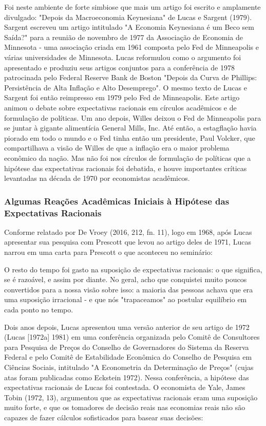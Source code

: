 \documentclass[12pt]{article}
\begin{document}
Foi neste ambiente de forte simbiose que mais um artigo foi escrito e amplamente divulgado: "Depois da Macroeconomia Keynesiana" de Lucas e Sargent (1979). Sargent escreveu um artigo intitulado "A Economia Keynesiana é um Beco sem Saída?" para a reunião de novembro de 1977 da Associação de Economia de Minnesota - uma associação criada em 1961 composta pelo Fed de Minneapolis e várias universidades de Minnesota. Lucas reformulou como o argumento foi apresentado e produziu seus artigos conjuntos para a conferência de 1978 patrocinada pelo Federal Reserve Bank de Boston "Depois da Curva de Phillips: Persistência de Alta Inflação e Alto Desemprego". O mesmo texto de Lucas e Sargent foi então reimpresso em 1979 pelo Fed de Minneapolis. Este artigo animou o debate sobre expectativas racionais em círculos acadêmicos e de formulação de políticas. Um ano depois, Willes deixou o Fed de Minneapolis para se juntar à gigante alimentícia General Mills, Inc. Até então, a estagflação havia piorado em todo o mundo e o Fed tinha então um presidente, Paul Volcker, que compartilhava a visão de Willes de que a inflação era o maior problema econômico da nação. Mas não foi nos círculos de formulação de políticas que a hipótese das expectativas racionais foi debatida, e houve importantes críticas levantadas na década de 1970 por economistas acadêmicos.

\subsubsection{\textbf{Algumas Reações Acadêmicas Iniciais à Hipótese das Expectativas Racionais}}

Conforme relatado por De Vroey (2016, 212, fn. 11), logo em 1968, após Lucas apresentar sua pesquisa com Prescott que levou ao artigo deles de 1971, Lucas narrou em uma carta para Prescott o que aconteceu no seminário:

O resto do tempo foi gasto na suposição de expectativas racionais: o que significa, se é razoável, e assim por diante. No geral, acho que conquistei muito poucos convertidos para a nossa visão sobre isso: a maioria das pessoas achava que era uma suposição irracional - e que nós "trapaceamos" ao postular equilíbrio em cada ponto no tempo.

Dois anos depois, Lucas apresentou uma versão anterior de seu artigo de 1972 (Lucas [1972a] 1981) em uma conferência organizada pelo Comitê de Consultores para Pesquisa de Preços do Conselho de Governadores do Sistema da Reserva Federal e pelo Comitê de Estabilidade Econômica do Conselho de Pesquisa em Ciências Sociais, intitulado "A Econometria da Determinação de Preços" (cujas atas foram publicadas como Eckstein 1972). Nessa conferência, a hipótese das expectativas racionais de Lucas foi contestada. O economista de Yale, James Tobin (1972, 13), argumentou que as expectativas racionais eram uma suposição muito forte, e que os tomadores de decisão reais nas economias reais não são capazes de fazer cálculos sofisticados para basear suas decisões:
\end{document}

